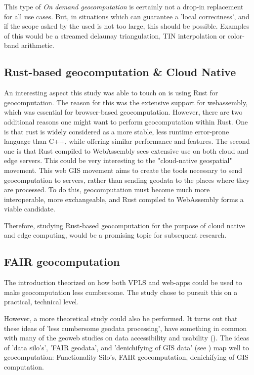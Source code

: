 This type of \emph{On demand geocomputation} is certainly not a drop-in replacement for all use cases. 
But, in situations which can guarantee a 'local correctness', and if the scope asked by the used is not too large, this should be possible. 
Examples of this would be a streamed delaunay triangulation, TIN interpolation or color-band arithmetic. 

\subsection{Rust-based geocomputation \& Cloud Native}
An interesting aspect this study was able to touch on is using Rust for geocomputation.
The reason for this was the extensive support for webassembly, which was essential for browser-based geocomputation. 
However, there are two additional reasons one might want to perform geocomputation within Rust.
One is that rust is widely considered as a more stable, less runtime error-prone language than C++, while offering similar performance and features. 
The second one is that Rust compiled to WebAssembly sees extensive use on both cloud and edge servers.  
This could be very interesting to the "cloud-native geospatial" movement. 
This web GIS movement aims to create the tools necessary to send geocomputation to servers, rather than sending geodata to the places where they are processed.
To do this, geocomputation must become much more interoperable, more exchangeable, and Rust compiled to WebAssembly forms a viable candidate. 

Therefore, studying Rust-based geocomputation for the purpose of cloud native and edge computing, would be a promising topic for subsequent research. 

\subsection{FAIR geocomputation}
The introduction theorized on how both VPLS and web-apps could be used to make geocomputation less cumbersome.
The study chose to pursuit this on a practical, technical level. 

However, a more theoretical study could also be performed. 
It turns out that these ideas of 'less cumbersome geodata processing', have something in common with many of the geoweb studies on data accessibility and usability (\cite{brink_geospatial_2018}).
The ideas of 'data silo's', 'FAIR geodata', and 'denichifying of \ac{GIS} data' (see \cite{brink_geospatial_2018}) map well to geocomputation:
Functionality Silo's, FAIR geocomputation, denichifying of \ac{GIS} computation. 

